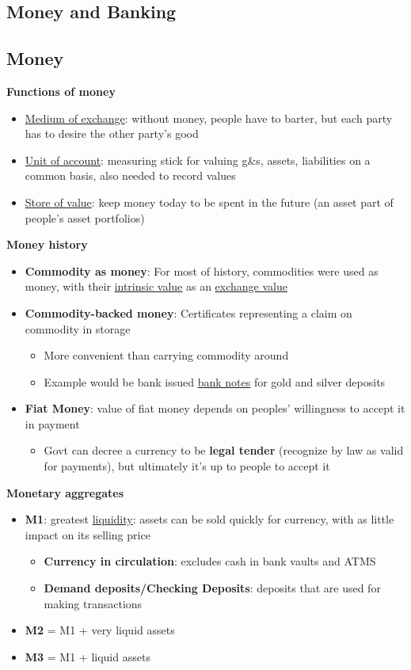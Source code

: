 \documentclass{article}
\begin{document}
\begin{multicols}{2}
\section{Money and Banking}
\subsection{Money}
\textbf{Functions of money}
\begin{itemize}
	\item \underline{Medium of exchange}: without money, people have to barter, but each party has to desire the other party's good
	\item \underline{Unit of account}: measuring stick for valuing g\&s, assets, liabilities on a common basis, also needed to record values
	\item \underline{Store of value}: keep money today to be spent in the future (an asset part of people's asset portfolios)
\end{itemize}
\textbf{Money history}
\begin{itemize}
	\item \textbf{Commodity as money}: For most of history, commodities were used as money, with their \underline{intrinsic value} as an \underline{exchange value}
	\item \textbf{Commodity-backed money}: Certificates representing a claim on commodity in storage
	\begin{itemize}
		\item More convenient than carrying commodity around
		\item Example would be bank issued \underline{bank notes} for gold and silver deposits
	\end{itemize}
    \item \textbf{Fiat Money}: value of fiat money depends on peoples' willingness to accept it in payment
    \begin{itemize}
    	\item Govt can decree a currency to be \textbf{legal tender} (recognize by law as valid for payments), but ultimately it's up to people to accept it
    \end{itemize}
\end{itemize}
\textbf{Monetary aggregates}
\begin{itemize}
	\item \textbf{M1}: greatest \underline{liquidity}: assets can be sold quickly for currency, with as little impact on its selling price
	\begin{itemize}
		\item \textbf{Currency in circulation}: excludes cash in bank vaults and ATMS
		\item \textbf{Demand deposits/Checking Deposits}: deposits that are used for making transactions
	\end{itemize}
    \item \textbf{M2} = M1 + very liquid assets
    \item \textbf{M3} = M1 + liquid assets
\end{itemize}


\end{multicols}
\end{document}

